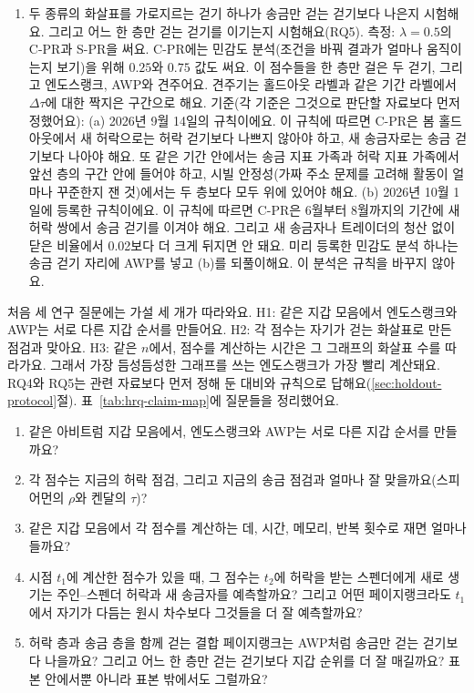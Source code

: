 \begin{enumerate}
\item[O5.] 두 종류의 화살표를 가로지르는 걷기 하나가 송금만 걷는 걷기보다 나은지 시험해요. 그리고 어느 한 층만 걷는 걷기를 이기는지 시험해요(RQ5). 측정: $\lambda=0.5$의 C-PR과 S-PR을 써요. C-PR에는 민감도 분석(조건을 바꿔 결과가 얼마나 움직이는지 보기)을 위해 $0.25$와 $0.75$ 값도 써요. 이 점수들을 한 층만 걸은 두 걷기, 그리고 엔도스랭크, AWP와 견주어요. 견주기는 홀드아웃 라벨과 같은 기간 라벨에서 $\Delta\tau$에 대한 짝지은 구간으로 해요. 기준(각 기준은 그것으로 판단할 자료보다 먼저 정했어요): (a) 2026년 9월 14일의 규칙이에요. 이 규칙에 따르면 C-PR은 봄 홀드아웃에서 새 허락으로는 허락 걷기보다 나쁘지 않아야 하고, 새 송금자로는 송금 걷기보다 나아야 해요. 또 같은 기간 안에서는 송금 지표 가족과 허락 지표 가족에서 앞선 층의 구간 안에 들어야 하고, 시빌 안정성(가짜 주소 문제를 고려해 활동이 얼마나 꾸준한지 잰 것)에서는 두 층보다 모두 위에 있어야 해요. (b) 2026년 10월 1일에 등록한 규칙이에요. 이 규칙에 따르면 C-PR은 6월부터 8월까지의 기간에 새 허락 쌍에서 송금 걷기를 이겨야 해요. 그리고 새 송금자나 트레이더의 청산 없이 닫은 비율에서 0.02보다 더 크게 뒤지면 안 돼요. 미리 등록한 민감도 분석 하나는 송금 걷기 자리에 AWP를 넣고 (b)를 되풀이해요. 이 분석은 규칙을 바꾸지 않아요.
\end{enumerate}


처음 세 연구 질문에는 가설 세 개가 따라와요. H1: 같은 지갑 모음에서 엔도스랭크와 AWP는 서로 다른 지갑 순서를 만들어요. H2: 각 점수는 자기가 걷는 화살표로 만든 점검과 맞아요. H3: 같은 $n$에서, 점수를 계산하는 시간은 그 그래프의 화살표 수를 따라가요. 그래서 가장 듬성듬성한 그래프를 쓰는 엔도스랭크가 가장 빨리 계산돼요. RQ4와 RQ5는 관련 자료보다 먼저 정해 둔 대비와 규칙으로 답해요(\ref{sec:holdout-protocol}절). 표~\ref{tab:hrq-claim-map}에 질문들을 정리했어요.

\begin{enumerate}
\item[RQ1.] 같은 아비트럼 지갑 모음에서, 엔도스랭크와 AWP는 서로 다른 지갑 순서를 만들까요?
\item[RQ2.] 각 점수는 지금의 허락 점검, 그리고 지금의 송금 점검과 얼마나 잘 맞을까요(스피어먼의 $\rho$와 켄달의 $\tau$)?
\item[RQ3.] 같은 지갑 모음에서 각 점수를 계산하는 데, 시간, 메모리, 반복 횟수로 재면 얼마나 들까요?
\item[RQ4.] 시점 $t_1$에 계산한 점수가 있을 때, 그 점수는 $t_2$에 허락을 받는 스펜더에게 새로 생기는 주인--스펜더 허락과 새 송금자를 예측할까요? 그리고 어떤 페이지랭크라도 $t_1$에서 자기가 다듬는 원시 차수보다 그것들을 더 잘 예측할까요?
\item[RQ5.] 허락 층과 송금 층을 함께 걷는 결합 페이지랭크는 AWP처럼 송금만 걷는 걷기보다 나을까요? 그리고 어느 한 층만 걷는 걷기보다 지갑 순위를 더 잘 매길까요? 표본 안에서뿐 아니라 표본 밖에서도 그럴까요?
\end{enumerate}

